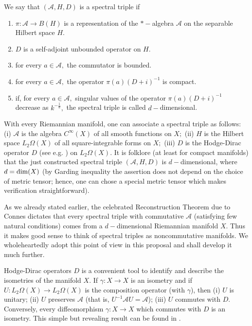 \documentclass{article}
\begin{document}
We say that $(\mathcal{A},H,D)$ is a spectral triple if
\begin{enumerate}
\item $\pi:\mathcal{A}\to B(H)$ is a representation of the $\ast-$algebra $\mathcal{A}$ on the separable Hilbert space $H.$
\item $D$ is a self-adjoint unbounded operator on $H.$
\item for every $a\in\mathcal{A},$ the commutator is bounded.
\item for every $a\in\mathcal{A},$ the operator $\pi(a)(D+i)^{-1}$ is compact.
\item if, for every $a\in\mathcal{A},$ singular values of the operator $\pi(a)(D+i)^{-1}$ decrease as $k^{-\frac1d},$ the spectral triple is called $d-$dimensional.
\end{enumerate}

With every Riemannian manifold, one can associate a spectral triple as follows: (i) $\mathcal{A}$ is the algebra $C^{\infty}(X)$ of all smooth functions on $X;$ (ii) $H$ is the Hilbert space $L_2\Omega(X)$ of all square-integrable forms on $X;$ (iii) $D$ is the Hodge-Dirac operator $D$ (see e.g. \cite{BGV}) on $L_2\Omega(X).$ It is folklore (at least for compact manifolds) that the just constructed spectral triple $(\mathcal{A},H,D)$ is $d-$dimensional, where $d={\rm dim}(X)$ (by Garding inequality the assertion does not depend on the choice of metric tensor; hence, one can chose a special metric tensor which makes verification straightforward).

As we already stated earlier, the celebrated Reconstruction Theorem due to Connes \cite{Connes-reconstruction} dictates that every spectral triple with commutative $\mathcal{A}$ (satisfying few natural conditions) comes from a $d-$dimensional Riemannian manifold $X.$ Thus it makes good sense to think of spectral triples as noncommutative manifolds. We wholeheartedly adopt this point of view in this proposal and shall develop it much further.


Hodge-Dirac operators $D$ is a convenient tool to identify and describe the isometries of the manifold $X.$ If $\gamma:X\to X$ is an isometry and if $U:L_2\Omega(X)\to L_2\Omega(X)$ is the composition operator (with $\gamma$), then (i) $U$ is unitary; (ii) $U$ preserves $\mathcal{A}$ (that is, $U^{-1}\mathcal{A}U=\mathcal{A}$); (iii) $U$ commutes with $D.$ Conversely, every diffeomorphism $\gamma:X\to X$ which commutes with $D$ is an isometry.
This simple but revealing result can be found in \cite{helgason}.
\end{document}
